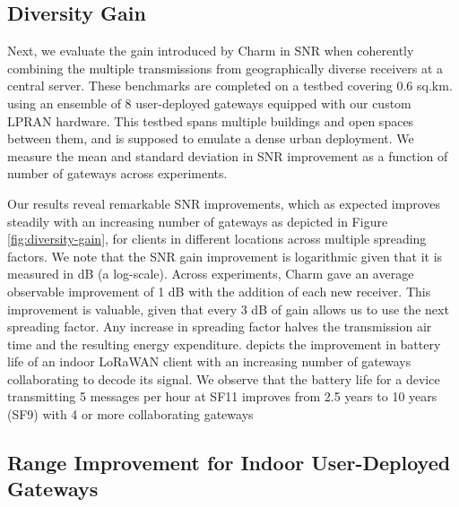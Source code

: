 \subsection{Diversity Gain}
\label{sec:diversity-gain-eval}

Next, we evaluate the  gain introduced by Charm in SNR when coherently
combining the multiple transmissions from geographically diverse receivers at
a central server. These benchmarks are completed on a testbed covering 0.6
sq.km. using an ensemble of 8 user-deployed gateways equipped with our custom
LPRAN hardware. This testbed spans multiple buildings and open spaces between
them, and is supposed to emulate a dense urban deployment. We measure the mean
and standard deviation in SNR improvement as a function of number of gateways
across experiments.

Our results reveal remarkable SNR improvements, which as expected improves
steadily with an increasing number of gateways as depicted in Figure
\ref{fig:diversity-gain}, for clients in different locations across multiple
spreading factors. We note that the SNR gain improvement is logarithmic given
that it is measured in dB (a log-scale). Across experiments, Charm gave an
average observable improvement of 1 dB with the addition of each new receiver.
This improvement is valuable, given that every 3 dB of gain allows us to use
the next spreading factor. Any increase in spreading factor halves the
transmission air time and the resulting energy expenditure.
 depicts the improvement in battery life of an
indoor LoRaWAN client with an increasing number of gateways collaborating to
decode its signal. We observe that the battery life for a device transmitting
5 messages per hour at SF11 improves from 2.5 years to 10 years (SF9) with 4
or more collaborating gateways


\subsection{Range Improvement for Indoor User-Deployed Gateways}



